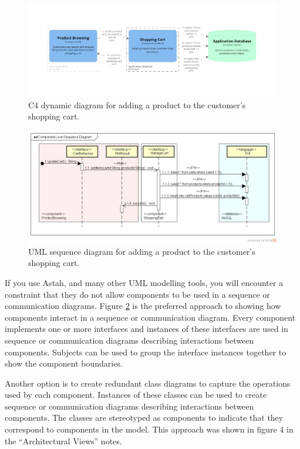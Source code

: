 \documentclass{csse4400}
\begin{document}
\begin{figure}[h!]
    \centering
    \includegraphics[trim=175 225 197 185,clip,width=\textwidth]{../../notes/views/images/c4/add_to_cart_dynamic_diagram.png}
    \caption{C4 dynamic diagram for adding a product to the customer's shopping cart.}
    \label{fig:c4_dynamic}
\end{figure}

\begin{figure}[h!]
    \centering
    \includegraphics[trim=36 77 25 47,clip,width=\textwidth]{images/component-sequence.png}
    \caption{UML sequence diagram for adding a product to the customer's shopping cart.}
    \label{fig:uml_sequence_diagram}
\end{figure}

\noindent
If you use Astah, and many other UML modelling tools, you will encounter a constraint that they do not allow components to be used in a sequence or communication diagrams.
Figure \ref{fig:uml_sequence_diagram} is the preferred approach to showing how components interact in a sequence or communication diagram.
Every component implements one or more interfaces and instances of these interfaces are used in sequence or communication diagrams describing interactions between components.
Subjects can be used to group the interface instances together to show the component boundaries.

Another option is to create redundant class diagrams to capture the operations used by each component.
Instances of these classes can be used to create sequence or communication diagrams describing interactions between components.
The classes are stereotyped as components to indicate that they correspond to components in the model.
This approach was shown in figure 4 in the ``Architectural Views'' notes.
\end{document}

